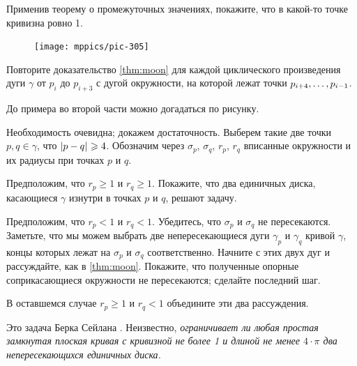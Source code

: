 \begin{multicols}{2}
Применив теорему о промежуточных значениях, покажите, что в какой-то точке кривизна ровно 1.

\begin{figure}
\vskip-6mm
\centering
\texttt{[image: mppics/pic-305]}
\vskip-2mm
\end{figure}

Повторите доказательство \ref{thm:moon} для каждой циклического произведения дуги $\gamma$ от $p_i$ до $p_{i+3}$ с дугой окружности, на которой лежат точки $p_{i+4},\z\dots,p_{i-1}$.

До примера во второй части можно догадаться по рисунку.






Необходимость очевидна; докажем достаточность.
Выберем такие две точки $p,q\in\gamma$, что $\dist{p}{q}{}\ge 4$.
Обозначим через $\sigma_p$, $\sigma_q$, $r_p$, $r_q$ вписанные окружности и их радиусы при точках $p$ и $q$.

Предположим, что $r_p\ge 1$ и $r_q\ge 1$.
Покажите, что два единичных диска, касающиеся $\gamma$ изнутри в точках $p$ и $q$, решают задачу.

Предположим, что $r_p< 1$ и $r_q<1$.
Убедитесь, что $\sigma_p$ и $\sigma_q$ не пересекаются.
Заметьте, что мы можем выбрать две непересекающиеся дуги $\gamma_p$ и $\gamma_q$ кривой $\gamma$, концы которых лежат на $\sigma_p$ и $\sigma_q$ соответственно.
Начните с этих двух дуг и рассуждайте, как в \ref{thm:moon}.
Покажите, что полученные опорные соприкасающиеся окружности не пересекаются; сделайте последний шаг.

В оставшемся случае $r_p\ge 1$ и $r_q<1$ объедините эти два рассуждения.

 Это задача Берка Сейлана \cite{ceylan}.
Неизвестно, \textit{ограничивает ли любая простая замкнутая плоская кривая с кривизной не более 1 и длиной не менее $4\cdot\pi$ два непересекающихся единичных диска.}


\end{multicols}
